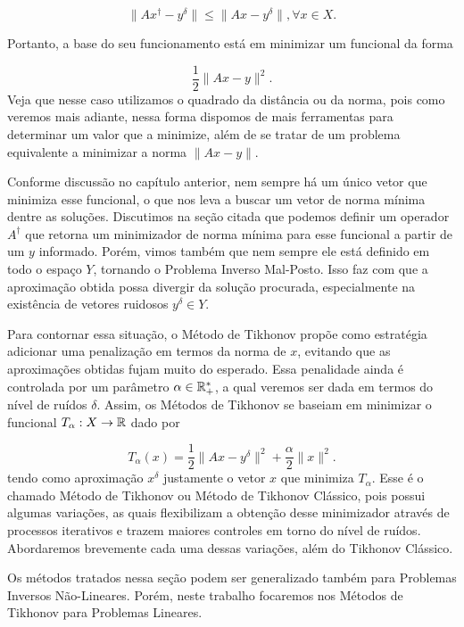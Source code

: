 \begin{equation*}
    \| A x^\dag - y^\delta \| \leq \| Ax - y^\delta \|, \forall x \in X.
\end{equation*}

Portanto, a base do seu funcionamento está em minimizar um funcional da forma 

\begin{equation*}
    \frac 1 2 \| Ax - y \|^2.
\end{equation*}
Veja que nesse caso utilizamos o quadrado da distância ou da norma, pois como veremos mais adiante, nessa forma dispomos de mais ferramentas para determinar um valor que a minimize, além de se tratar de um problema equivalente a minimizar a norma $\| Ax - y\|$.

Conforme discussão no capítulo anterior, nem sempre há um único vetor que minimiza esse funcional, o que nos leva a buscar um vetor de norma mínima dentre as soluções. Discutimos na seção citada que podemos definir um operador $A^\dag$ que retorna um minimizador de norma mínima para esse funcional a partir de um $y$ informado. Porém, vimos também que nem sempre ele está definido em todo o espaço $Y$, tornando o Problema Inverso Mal-Posto. Isso faz com que a aproximação obtida possa divergir da solução procurada, especialmente na existência de vetores ruidosos $y^\delta \in Y$. 

Para contornar essa situação, o Método de Tikhonov propõe como estratégia adicionar uma penalização em termos da norma de $x$, evitando que as aproximações obtidas fujam muito do esperado. Essa penalidade ainda é controlada por um parâmetro $\alpha \in \mathbb{R}^*_+$, a qual veremos ser dada em termos do nível de ruídos $\delta$. Assim, os Métodos de Tikhonov se baseiam em minimizar o funcional $T_\alpha : X \to \mathbb{R}$ dado por

\begin{equation}
    T_\alpha(x) = \frac 1 2 \| Ax-y^\delta \|^2 + \frac \alpha 2 \| x \|^2.
\end{equation}
tendo como aproximação $x^\delta$ justamente o vetor $x$ que minimiza $T_\alpha$. Esse é o chamado Método de Tikhonov ou Método de Tikhonov Clássico, pois possui algumas variações, as quais flexibilizam a obtenção desse minimizador através de processos iterativos e trazem maiores controles em torno do nível de ruídos. Abordaremos brevemente cada uma dessas variações, além do Tikhonov Clássico.

Os métodos tratados nessa seção podem ser generalizado também para Problemas Inversos Não-Lineares. Porém, neste trabalho focaremos nos Métodos de Tikhonov para Problemas Lineares.

